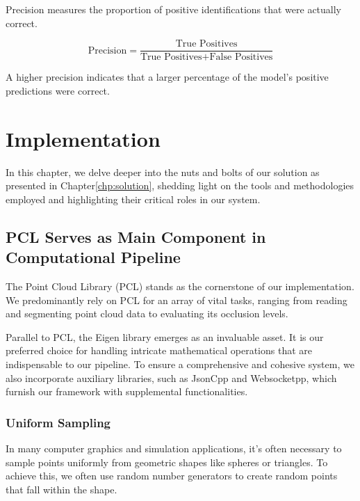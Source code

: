 \documentclass[11pt, a4paper,oneside,chapterprefix=false]{scrbook}
\begin{document}
Precision measures the proportion of positive identifications that were actually correct.

\begin{equation}
	\text{Precision} = \frac{\text{True Positives}}{\text{True Positives} + \text{False Positives}}
\end{equation}

A higher precision indicates that a larger percentage of the model's positive predictions were correct.

\chapter{Implementation}\label{chp:implementation}

In this chapter, we delve deeper into the nuts and bolts of our solution as presented in Chapter\ref{chp:solution}, shedding light on the tools and methodologies employed and highlighting their critical roles in our system.

\section{PCL Serves as Main Component in Computational Pipeline}\label{sec:pcl and eigen}

The Point Cloud Library (PCL) stands as the cornerstone of our implementation. We predominantly rely on PCL for an array of vital tasks, ranging from reading and segmenting point cloud data to evaluating its occlusion levels.

Parallel to PCL, the Eigen library emerges as an invaluable asset. It is our preferred choice for handling intricate mathematical operations that are indispensable to our pipeline. To ensure a comprehensive and cohesive system, we also incorporate auxiliary libraries, such as JsonCpp and Websocketpp, which furnish our framework with supplemental functionalities.

\subsection{Uniform Sampling}\label{subsec:uniform sampling}

In many computer graphics and simulation applications, it's often necessary to sample points uniformly from geometric shapes like spheres or triangles. To achieve this, we often use random number generators to create random points that fall within the shape.
\end{document}
